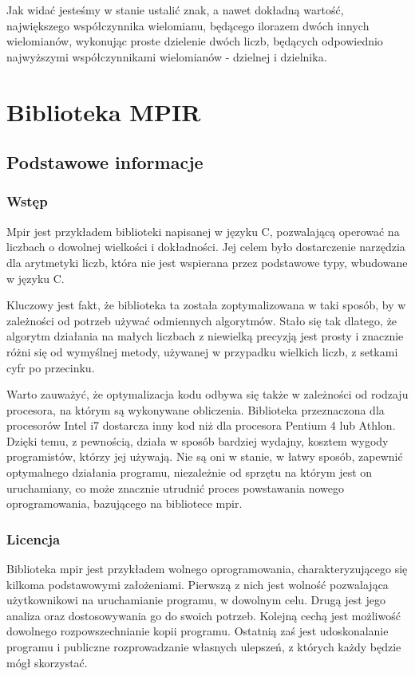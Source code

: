 \documentclass[twoside,a4paper]{book}
\begin{document}
Jak widać jesteśmy w stanie ustalić znak, a nawet dokładną wartość, największego współczynnika wielomianu, będącego ilorazem dwóch innych wielomianów, wykonując proste dzielenie dwóch liczb, będących odpowiednio najwyższymi współczynnikami wielomianów - dzielnej i dzielnika.

\section{Biblioteka MPIR}

\subsection{Podstawowe informacje}

\subsubsection{Wstęp}

Mpir jest przykładem biblioteki napisanej w języku C, pozwalającą operować na liczbach o dowolnej wielkości i dokładności. Jej celem było dostarczenie narzędzia dla arytmetyki liczb, która nie jest wspierana przez podstawowe typy, wbudowane w języku C.

Kluczowy jest fakt, że biblioteka ta została zoptymalizowana w taki sposób, by w zależności od potrzeb używać odmiennych algorytmów. Stało się tak dlatego, że algorytm działania na małych liczbach z niewielką precyzją jest prosty i znacznie różni się od wymyślnej metody, używanej w przypadku wielkich liczb, z setkami cyfr po przecinku.

Warto zauważyć, że optymalizacja kodu odbywa się także w zależności od rodzaju procesora, na którym są wykonywane obliczenia. Biblioteka przeznaczona dla procesorów Intel i7 dostarcza inny kod niż dla procesora Pentium 4 lub Athlon. Dzięki temu, z pewnością, działa w sposób bardziej wydajny, kosztem wygody programistów, którzy jej używają. Nie są oni w stanie, w łatwy sposób, zapewnić optymalnego działania programu, niezależnie od sprzętu na którym jest on uruchamiany, co może znacznie utrudnić proces powstawania nowego oprogramowania, bazującego na bibliotece mpir.

\subsubsection{Licencja}

Biblioteka mpir jest przykładem wolnego oprogramowania, charakteryzującego się kilkoma podstawowymi założeniami. Pierwszą z nich jest wolność pozwalająca użytkownikowi na uruchamianie programu, w dowolnym celu. Drugą jest jego analiza oraz dostosowywania go do swoich potrzeb. Kolejną cechą jest możliwość dowolnego rozpowszechnianie kopii programu. Ostatnią zaś jest udoskonalanie programu i publiczne rozprowadzanie własnych ulepszeń, z których każdy będzie mógł skorzystać.
\end{document}
